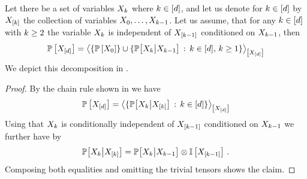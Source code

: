 \begin{theorem}
    \label{the:MarkovChain}
    Let there be a set of variables $X_{k}$ where $k\in[d]$, and let us denote for $k\in[d]$ by $X_{[k]}$ the collection of variables $X_{0},\ldots,X_{k-1}$.
    Let us assume, that for any $k\in[d]$ with $k\geq2$ the variable $X_{k}$ is independent of $X_{[k-1]}$ conditioned on $X_{k-1}$, then
    \begin{align*}
        \mathbb{P}\left[X_{[d]}\right]
        = \left\langle \{\mathbb{P}\left[X_{0}\right]\} \cup \{\mathbb{P}\big[X_{k}\big|X_{k-1}\big]\,:\,k\in[d], \, k\geq1\}\right\rangle_{\left[ X_{[d]} \right]}
    \end{align*}
    We depict this decomposition in .
\end{theorem}
\begin{proof}
    By the chain rule shown in  we have
    \begin{align*}
        \mathbb{P}\left[X_{[d]}\right]
        = \left\langle 
            \{ \mathbb{P}\big[X_{k}\big|X_{[k]}\big] \,:\, k\in[d] \}
        \right\rangle_{\left[ X_{[d]} \right]}
    \end{align*}
    Using that $X_{k}$ is conditionally independent of $X_{[k-1]}$ conditioned on $X_{k-1}$ we further have by 
    \begin{align*}
        \mathbb{P}\big[X_{k}\big|X_{[k]}\big]
        = \mathbb{P}\big[X_{k}\big|X_{k-1}\big] \otimes \mathbb{I}\left[X_{[k-1]}\right] \, .
    \end{align*}
    Composing both equalities and omitting the trivial tensors shows the claim.
\end{proof}


